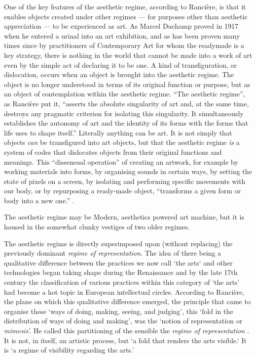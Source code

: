 \documentclass[letterpaper]{article}
\begin{document}
    One of the key features of the aesthetic regime, according to Rancière, is that it enables objects created under other regimes — for purposes other than aesthetic appreciation — to be experienced as art. As Marcel Duchamp proved in 1917 when he entered a urinal into an art exhibition, and as has been proven many times since by practitioners of Contemporary Art for whom the readymade is a key strategy, there is nothing in the world that cannot be made into a work of art even by the simple act of declaring it to be one. A kind of transfiguration, or dislocation, occurs when an object is brought into the aesthetic regime. The object is no longer understood in terms of its original function or purpose, but as an object of contemplation within the aesthetic regime. “The aesthetic regime”, as Rancière put it, “asserts the absolute singularity of art and, at the same time, destroys any pragmatic criterion for isolating this singularity. It simultaneously establishes the autonomy of art and the identity of its forms with the forms that life uses to shape itself.” Literally anything can be art. It is not simply that objects \emph{can} be transfigured into art objects, but that the aesthetic regime \emph{is} a system of codes that dislocates objects from their original functions and meanings. This “dissensual operation” of creating an artwork, for example by working materials into forms, by organising sounds in certain ways, by setting the state of pixels on a screen, by isolating and performing specific movements with our body, or by repurposing a ready-made object, “transforms a given form or body into a new one.” \citep[p.54]{RancierThEmncptdSpcttr2009}.

    The aesthetic regime may be Modern, aesthetics powered art machine, but it is housed in the somewhat clunky vestiges of two older regimes. 
    
    The aesthetic regime is directly superimposed upon (without replacing) the previously dominant \emph{regime of representation}. The idea of there being a qualitative difference between the practices we now call ‘the arts‘ and other technologies began taking shape during the Renaissance \citep[p.136]{TatarkiewiczWhtIsArt1971} and by the late 17th century the classification of various practices within this category of ‘the arts’ had become a hot topic in European intellectual circles. According to Rancière, the plane on which this qualitative difference emerged, the principle that came to organise these ‘ways of doing, making, seeing, and judging’, this ‘fold in the distribution of ways of doing and making’, was the ‘notion of representation or \emph{mimesis}’. He called this partitioning of the sensible the \emph{regime of representation} \citep[p.22]{RancierPltcsOfThAsthtcs2004}. It is not, in itself, an artistic process, but ‘a fold that renders the arts visible.‘ It is  ‘a regime of visibility regarding the arts.’
    
\end{document}
